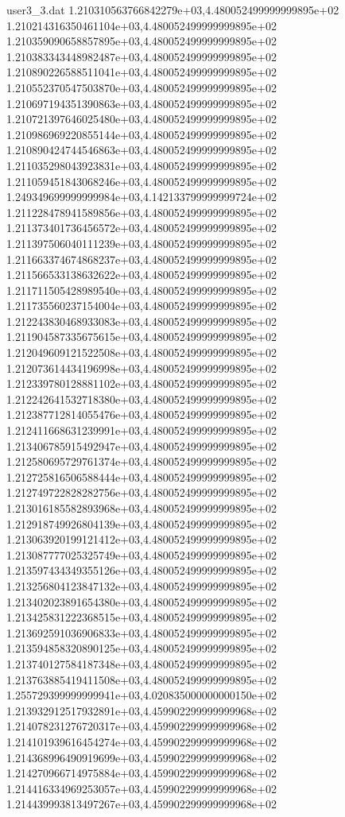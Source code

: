 \begin{filecontents}{user3_3.dat}
1.210310563766842279e+03,4.480052499999999895e+02
1.210214316350461104e+03,4.480052499999999895e+02
1.210359090658857895e+03,4.480052499999999895e+02
1.210383343448982487e+03,4.480052499999999895e+02
1.210890226588511041e+03,4.480052499999999895e+02
1.210552370547503870e+03,4.480052499999999895e+02
1.210697194351390863e+03,4.480052499999999895e+02
1.210721397646025480e+03,4.480052499999999895e+02
1.210986969220855144e+03,4.480052499999999895e+02
1.210890424744546863e+03,4.480052499999999895e+02
1.211035298043923831e+03,4.480052499999999895e+02
1.211059451843068246e+03,4.480052499999999895e+02
1.249349699999999984e+03,4.142133799999999724e+02
1.211228478941589856e+03,4.480052499999999895e+02
1.211373401736456572e+03,4.480052499999999895e+02
1.211397506040111239e+03,4.480052499999999895e+02
1.211663374674868237e+03,4.480052499999999895e+02
1.211566533138632622e+03,4.480052499999999895e+02
1.211711505428989540e+03,4.480052499999999895e+02
1.211735560237154004e+03,4.480052499999999895e+02
1.212243830468933083e+03,4.480052499999999895e+02
1.211904587335675615e+03,4.480052499999999895e+02
1.212049609121522508e+03,4.480052499999999895e+02
1.212073614434196998e+03,4.480052499999999895e+02
1.212339780128881102e+03,4.480052499999999895e+02
1.212242641532718380e+03,4.480052499999999895e+02
1.212387712814055476e+03,4.480052499999999895e+02
1.212411668631239991e+03,4.480052499999999895e+02
1.213406785915492947e+03,4.480052499999999895e+02
1.212580695729761374e+03,4.480052499999999895e+02
1.212725816506588444e+03,4.480052499999999895e+02
1.212749722828282756e+03,4.480052499999999895e+02
1.213016185582893968e+03,4.480052499999999895e+02
1.212918749926804139e+03,4.480052499999999895e+02
1.213063920199121412e+03,4.480052499999999895e+02
1.213087777025325749e+03,4.480052499999999895e+02
1.213597434349355126e+03,4.480052499999999895e+02
1.213256804123847132e+03,4.480052499999999895e+02
1.213402023891654380e+03,4.480052499999999895e+02
1.213425831222368515e+03,4.480052499999999895e+02
1.213692591036906833e+03,4.480052499999999895e+02
1.213594858320890125e+03,4.480052499999999895e+02
1.213740127584187348e+03,4.480052499999999895e+02
1.213763885419411508e+03,4.480052499999999895e+02
1.255729399999999941e+03,4.020835000000000150e+02
1.213932912517932891e+03,4.459902299999999968e+02
1.214078231276720317e+03,4.459902299999999968e+02
1.214101939616454274e+03,4.459902299999999968e+02
1.214368996490919699e+03,4.459902299999999968e+02
1.214270966714975884e+03,4.459902299999999968e+02
1.214416334969253057e+03,4.459902299999999968e+02
1.214439993813497267e+03,4.459902299999999968e+02

\end{filecontents}
